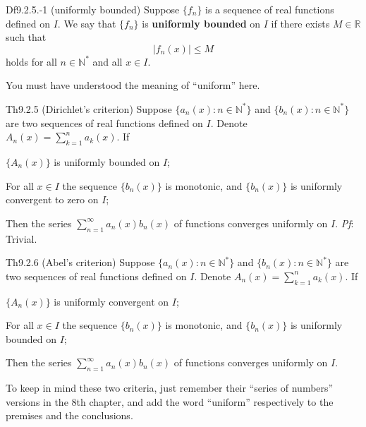 \documentclass{article}
\begin{document}
\begin{Df}{Df9.2.5.-1 (uniformly bounded)}
    Suppose $\{f_n\}$ is a sequence of real functions defined on $I$. We say that $\{f_n\}$ is \textbf{uniformly bounded} on $I$ if there exists $M\in\mathbb{R}$ such that
    $$ |f_n(x)| \leq M $$
    holds for all $n\in\mathbb{N}^\ast$ and all $x\in I$.
\end{Df}

\begin{Rmk}{}
    You must have understood the meaning of ``uniform'' here.
\end{Rmk}

\begin{Th}{Th9.2.5 (Dirichlet's criterion)}
    Suppose $\{a_n(x): n\in\mathbb{N}^\ast\}$ and $\{b_n(x): n\in\mathbb{N}^\ast\}$ are two sequences of real functions defined on $I$. Denote $A_n(x) = \sum_{k=1}^{n} a_k(x)$. If
    \begin{compactenum}
        \item $\{A_n(x)\}$ is uniformly bounded on $I$;
        \item For all $x\in I$ the sequence $\{b_n(x)\}$ is monotonic, and $\{b_n(x)\}$ is uniformly convergent to zero on $I$;
    \end{compactenum}
    Then the series $\sum_{n=1}^{\infty} a_n(x)b_n(x)$ of functions converges uniformly on $I$.
    \tcblower
    \textit{Pf}: Trivial.
\end{Th}

\begin{Th}{Th9.2.6 (Abel's criterion)}
    Suppose $\{a_n(x): n\in\mathbb{N}^\ast\}$ and $\{b_n(x): n\in\mathbb{N}^\ast\}$ are two sequences of real functions defined on $I$. Denote $A_n(x) = \sum_{k=1}^{n} a_k(x)$. If
    \begin{compactenum}
        \item $\{A_n(x)\}$ is uniformly convergent on $I$;
        \item For all $x\in I$ the sequence $\{b_n(x)\}$ is monotonic, and $\{b_n(x)\}$ is uniformly bounded on $I$;
    \end{compactenum}
    Then the series $\sum_{n=1}^{\infty} a_n(x)b_n(x)$ of functions converges uniformly on $I$.
\end{Th}

\begin{Rmk}{}
    To keep in mind these two criteria, just remember their ``series of numbers'' versions in the 8th chapter, and add the word ``uniform'' respectively to the premises and the conclusions.
\end{Rmk}
\end{document}
